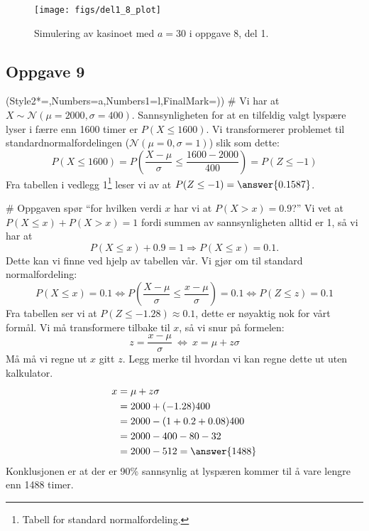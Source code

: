 \begin{easylist}[enumerate]
	\begin{figure}[th!]
		\centering
		\texttt{[image: figs/del1\_8\_plot]}
		\caption{Simulering av kasinoet med $a = 30$ i oppgave 8, del 1.}
		\label{fig:del18plot}
	\end{figure}
\end{easylist}

\subsection*{Oppgave 9}
\begin{easylist}[enumerate]
	\ListProperties(Style2*=,Numbers=a,Numbers1=l,FinalMark={)})
	# Vi har at $X \sim \mathcal{N}(\mu = 2000, \sigma = 400)$. Sannsynligheten for at en tilfeldig valgt lyspære lyser i færre enn 1600 timer er $P(X \leq 1600)$. Vi transformerer problemet til standardnormalfordelingen ($\mathcal{N}(\mu = 0, \sigma = 1)$) slik som dette:
	\begin{equation*}
		P(X \leq 1600) =P\left(\frac{X-\mu}{\sigma} \leq \frac{1600-2000}{400} \right) = P(Z \leq -1)
	\end{equation*}
	Fra tabellen i vedlegg 1\footnote{Tabell for standard normalfordeling.} leser vi av at $P(Z \leq -1) = \answer{0.1587}$.
	
	#  Oppgaven spør ``for hvilken verdi $x$ har vi at $P(X > x) = 0.9$?'' 
	Vi vet at $P(X \leq x) + P(X > x) = 1$ fordi summen av sannsynligheten alltid er 1, så vi har at
	\begin{equation*}
		P(X \leq x) + 0.9 = 1 \Rightarrow P(X \leq x) = 0.1.
	\end{equation*}
	Dette kan vi finne ved hjelp av tabellen vår. Vi gjør om til standard normalfordeling:
	\begin{equation*}
		P(X \leq x) = 0.1 \Leftrightarrow P\left(\frac{X-\mu}{\sigma} \leq \frac{x-\mu}{\sigma}\right) = 0.1 \Leftrightarrow P(Z \leq z) = 0.1
	\end{equation*}
	Fra tabellen ser vi at $P(Z \leq -1.28) \approx 0.1$, dette er nøyaktig nok for vårt formål.
	Vi må transformere tilbake til $x$, så vi snur på formelen:
	\begin{equation*}
		z = \frac{x - \mu}{\sigma} \ \Leftrightarrow \ x = \mu + z \sigma
	\end{equation*}
	Må må vi regne ut $x$ gitt $z$. Legg merke til hvordan vi kan regne dette ut uten kalkulator.
	\begin{align*}
		x &= \mu + z \sigma \\
		  &= 2000 + (-1.28) 400 \\
		  &= 2000 - (1+0.2 + 0.08)400 \\
		  &= 2000 - 400 - 80 - 32 \\
		  &= 2000 - 512 = \answer{1488}
	\end{align*}
	Konklusjonen er at der er 90\% sannsynlig at lyspæren kommer til å vare lengre enn 1488 timer.
	

\end{easylist}
